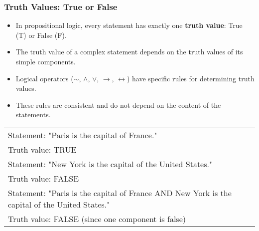 \documentclass{beamer}
\begin{document}
                \begin{frame}
                \frametitle{Truth Values: True or False}
                \begin{itemize}
                    \item In propositional logic, every statement has exactly one \textbf{truth value}: True (T) or False (F).
                    \item The truth value of a complex statement depends on the truth values of its simple components.
                    \item Logical operators ($\sim$, $\wedge$, $\vee$, $\rightarrow$, $\leftrightarrow$) have specific rules for determining truth values.
                    \item These rules are consistent and do not depend on the content of the statements.
                \end{itemize}
                
                \begin{center}
                \begin{tabular}{|p{}|}
                \hline
                Statement: "Paris is the capital of France."\\
                Truth value: TRUE\\[0.3cm]
                Statement: "New York is the capital of the United States."\\
                Truth value: FALSE\\[0.3cm]
                Statement: "Paris is the capital of France AND New York is the capital of the United States."\\
                Truth value: FALSE (since one component is false)\\
                \hline
                \end{tabular}
                \end{center}
                \end{frame}
                
\end{document}
